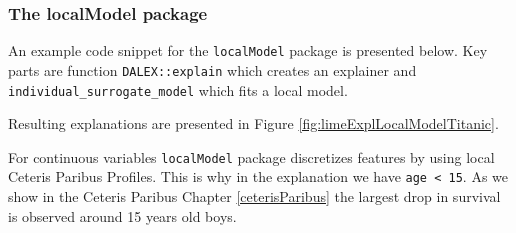 \documentclass[12pt,]{krantz}
\newenvironment{Shaded}{\begin{snugshade}}{\end{snugshade}}
\newcommand{\CommentTok}[1]{\textcolor[rgb]{0.56,0.35,0.01}{\textit{#1}}}
\newcommand{\DataTypeTok}[1]{\textcolor[rgb]{0.13,0.29,0.53}{#1}}
\newcommand{\DecValTok}[1]{\textcolor[rgb]{0.00,0.00,0.81}{#1}}
\newcommand{\KeywordTok}[1]{\textcolor[rgb]{0.13,0.29,0.53}{\textbf{#1}}}
\newcommand{\NormalTok}[1]{#1}
\newcommand{\OperatorTok}[1]{\textcolor[rgb]{0.81,0.36,0.00}{\textbf{#1}}}
\newcommand{\StringTok}[1]{\textcolor[rgb]{0.31,0.60,0.02}{#1}}
\theoremstyle{definition}
\theoremstyle{definition}
\theoremstyle{definition}
\theoremstyle{remark}
\begin{document}
\hypertarget{the-localmodel-package}{%
\subsubsection{\texorpdfstring{\textbf{The localModel
package}}{The localModel package}}\label{the-localmodel-package}}

An example code snippet for the \texttt{localModel} package is presented
below. Key parts are function \texttt{DALEX::explain} which creates an
explainer and \texttt{individual\_surrogate\_model} which fits a local
model.

Resulting explanations are presented in Figure
\ref{fig:limeExplLocalModelTitanic}.

For continuous variables \texttt{localModel} package discretizes
features by using local Ceteris Paribus Profiles. This is why in the
explanation we have \texttt{age\ \textless{}\ 15}. As we show in the
Ceteris Paribus Chapter \ref{ceterisParibus} the largest drop in
survival is observed around 15 years old boys.

\begin{Shaded}
\end{Shaded}
\end{document}
